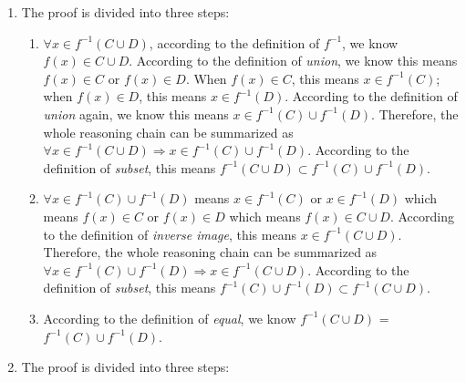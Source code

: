 \documentclass[12pt, letterpaper, oneside]{book}
\begin{document}
\begin{enumerate}
  \item The proof is divided into three steps:
    \begin{enumerate}
      \item $\forall x \in f^{-1}(C \cup D)$, according to the definition of
        $f^{-1}$, we know $f(x) \in C \cup D$. According to the definition of
        \textit{union}, we know this means $f(x) \in C$ or $f(x) \in D$. When
        $f(x) \in C$, this means $x \in f^{-1}(C)$; when $f(x) \in D$, this
        means $x \in f^{-1}(D)$. According to the definition of \textit{union}
        again, we know this means $x \in f^{-1}(C) \cup f^{-1}(D)$. Therefore,
        the whole reasoning chain can be summarized as $\forall x \in f^{-1}(C
        \cup D) \Rightarrow x \in f^{-1}(C) \cup f^{-1}(D)$. According to the
        definition of \textit{subset}, this means $f^{-1}(C \cup D) \subset
        f^{-1}(C) \cup f^{-1}(D)$.
      \item $\forall x \in f^{-1}(C) \cup f^{-1}(D)$ means $x \in f^{-1}(C)$ or
        $x \in f^{-1}(D)$ which means $f(x) \in C$ or $f(x) \in D$ which means
        $f(x) \in C \cup D$. According to the definition of \textit{inverse
        image}, this means $x \in f^{-1}(C \cup D)$. Therefore, the whole
        reasoning chain can be summarized as $\forall x \in f^{-1}(C) \cup
        f^{-1}(D) \Rightarrow x \in f^{-1}(C \cup D)$. According to the
        definition of \textit{subset}, this means $f^{-1}(C) \cup f^{-1}(D)
        \subset f^{-1}(C \cup D)$.
      \item According to the definition of \textit{equal}, we know $f^{-1}(C
        \cup D)$ = $f^{-1}(C) \cup f^{-1}(D)$.
    \end{enumerate}
  \item The proof is divided into three steps:
\end{enumerate}
\end{document}
